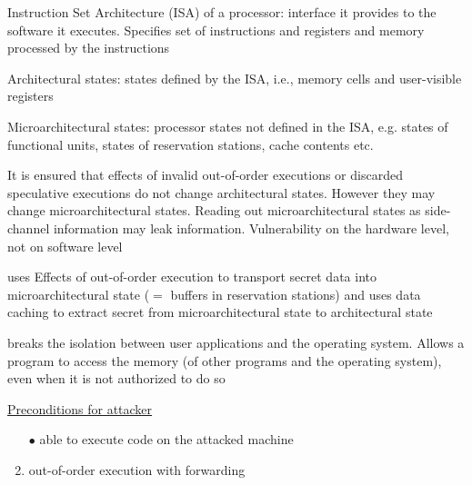 \documentclass[landscape, a4paper]{article}
\begin{document}
\begin{minipage}[t]{0.2\pagewidth}
	\begin{betterlist}
		\item \alert{Instruction Set Architecture (ISA) of a processor:} interface it provides to the software it executes. Specifies set of instructions and registers and memory processed by the instructions
		\item \alert{Architectural states:} states defined by the ISA, i.e., memory cells and user-visible registers
		\item \alert{Microarchitectural states:} processor states not defined in the ISA, e.g. states of functional units, states of reservation stations, cache contents etc.
		\item It is ensured that effects of invalid out-of-order executions or discarded speculative executions do not change architectural states. However they may change microarchitectural states. Reading out microarchitectural states as side-channel information may leak information. Vulnerability on the hardware level, not on software level
	\end{betterlist}
	\begin{betterlist}
		\item uses Effects of \alert{out-of-order execution} to transport secret data into \alert{microarchitectural state} ($=$ buffers in reservation stations) and  uses \alert{data caching} to extract secret from microarchitectural state to \alert{architectural state}
		\begin{betterlist}
			\item breaks the isolation between user applications and the operating system. Allows a program to access the memory (of other programs and the operating system), even when it is not authorized to do so
		\end{betterlist}
		\item \underline{Preconditions for attacker}
		\begin{enumerate}
			\item[\bfseries\color{PrimaryColor}$\bullet$] able to execute code on the attacked machine
			\item out-of-order execution with forwarding
\end{enumerate}
\end{betterlist}
\end{minipage}
\end{document}
